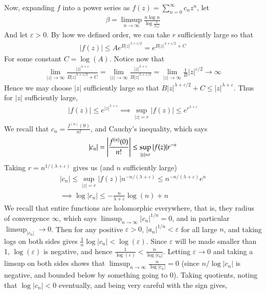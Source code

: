 \documentclass[12pt]{article}
\def \ve{\varepsilon}
\theoremstyle{definition}
\theoremstyle{remark}
\begin{document}
\begin{enumerate}[leftmargin=\labelsep]
	Now, expanding $f$ into a power series as $f(z) = \sum_{n=0}^\infty c_nz^n$, let \begin{align*}
		\beta = \limsup_{n \to \infty} \frac{n\log n}{\log \frac{1}{|c_n|}}
	\end{align*}
	And let $\ve > 0$. By how we defined order, we can take $r$ sufficiently large so that 
	\begin{align*}
		|f(z)| \leq Ae^{B|z|^{\lambda+\ve/2}}=e^{B|z|^{\lambda+\ve/2}+C}
	\end{align*}
	For some constant $C = \log(A)$. Notice now that 
	\begin{align*}
		\lim_{|z| \to \infty} \frac{|z|^{\lambda + \ve}}{B|z|^{\lambda + \ve/2} + C} = \lim_{|z| \to \infty} \frac{|z|^{\lambda+\ve}}{B|z|^{\lambda+\ve/2}} = \lim_{|z| \to \infty} \frac1B |z|^{\ve/2} \to \infty
	\end{align*}
	Hence we may choose $|z|$ sufficiently large so that $B|z|^{\lambda + \ve/2} + C \leq |z|^{\lambda + \ve}$. Thus for $|z|$ sufficiently large,
	\begin{align*}
		|f(z)| \leq e^{|z|^{\lambda + \ve}} \implies \sup_{|z| = r} |f(z)| \leq e^{r^{\lambda + \ve}}
	\end{align*}
	We recall that $c_n = \frac{f^{(n)}(0)}{n!}$, and Cauchy's inequality, which says
	\begin{align*}
		|c_n| = \qty|\frac{f^{(n)}(0)}{n!}| \leq \sup_{|z| = r} |f(z)| r^{-n}
	\end{align*}
	Taking $r = n^{1/(\lambda + \ve)}$ gives us (and $n$ sufficiently large)
	\begin{align*}
		|c_n| \leq \sup_{|z| = r} |f(z)| n^{-n/(\lambda + \ve)} \leq n^{-n/(\lambda + \ve)} e^{n} \\
		\implies \log|c_n| \leq -\frac{n}{\lambda + \ve}\log(n) + n
	\end{align*}
	We recall that entire functions are holomorphic everywhere, that is, they radius of convergence $\infty$, which says $\limsup_{n \to \infty} |c_n|^{1/n} = 0$, and in particular $\limsup_{|c_n|} \to 0$. Then for any positive $\ve > 0$, $|a_n|^{1/n} < \ve$ for all large $n$, and taking logs on both sides  gives $\frac1n \log|c_n| < \log(\ve)$. Since $\ve$ will be made smaller than 1, $\log(\ve)$ is negative, and hence $\frac{1}{\log(\ve)} < \frac{n}{\log|c_n|}$. Letting $\ve \to 0$ and taking a limsup on both sides shows that $\limsup_{n \to \infty} \frac{n}{\log|c_n|} = 0$ (since $n/\log|c_n|$ is negative, and bounded below by something going to 0). Taking quotients, noting that $\log|c_n| < 0$ eventually, and being very careful with the sign gives,

\end{enumerate}
\end{document}
